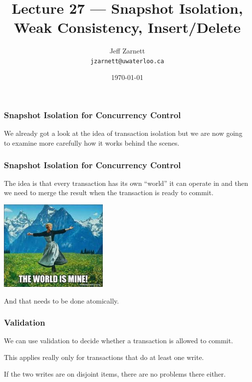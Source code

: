 

\title{Lecture  27 --- Snapshot Isolation, Weak Consistency, Insert/Delete}

\author{Jeff Zarnett \\ \small \texttt{jzarnett@uwaterloo.ca}}
\date{\today}




\begin{frame}
  \titlepage

 \end{frame}



\begin{frame}
\frametitle{Snapshot Isolation for Concurrency Control}

We already got a look at the idea of transaction isolation but we are now going to examine more carefully how it works behind the scenes. 

 \end{frame}



\begin{frame}
\frametitle{Snapshot Isolation for Concurrency Control}
The idea is that every transaction has its own ``world'' it can operate in and then we need to merge the result when the transaction is ready to commit. 

\begin{center}
	\includegraphics[width=0.4\textwidth]{images/ismine.jpg}
\end{center}

And that needs to be done atomically.


\end{frame}

\begin{frame}
\frametitle{Validation}
We can use validation to decide whether a transaction is allowed to commit. 

This applies really only for transactions that do at least one write. 

If the two writes are on disjoint items, there are no problems there either. 


\end{frame}

